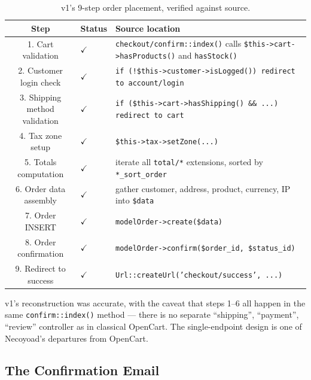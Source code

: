 \documentclass[11pt,a4paper]{article}
\begin{document}
\begin{table}[htbp]
\centering
\caption{v1's 9-step order placement, verified against source.}\label{tab:order-verify}
\small
\begin{tabularx}{\columnwidth}{clX}
\toprule
\textbf{Step} & \textbf{Status} & \textbf{Source location} \\
\midrule
1. Cart validation            & \colorbox{nodefillgreen}{$\checkmark$} & \texttt{checkout/confirm::index()} calls \texttt{\$this->cart->hasProducts()} and \texttt{hasStock()} \\
2. Customer login check       & \colorbox{nodefillgreen}{$\checkmark$} & \texttt{if (!\$this->customer->isLogged()) redirect to account/login} \\
3. Shipping method validation & \colorbox{nodefillgreen}{$\checkmark$} & \texttt{if (\$this->cart->hasShipping() \&\& ...) redirect to cart} \\
4. Tax zone setup             & \colorbox{nodefillgreen}{$\checkmark$} & \texttt{\$this->tax->setZone(...)} \\
5. Totals computation         & \colorbox{nodefillgreen}{$\checkmark$} & iterate all \texttt{total/*} extensions, sorted by \texttt{*\_sort\_order} \\
6. Order data assembly        & \colorbox{nodefillgreen}{$\checkmark$} & gather customer, address, product, currency, IP into \texttt{\$data} \\
7. Order INSERT               & \colorbox{nodefillgreen}{$\checkmark$} & \texttt{modelOrder->create(\$data)} \\
8. Order confirmation         & \colorbox{nodefillgreen}{$\checkmark$} & \texttt{modelOrder->confirm(\$order\_id, \$status\_id)} \\
9. Redirect to success        & \colorbox{nodefillgreen}{$\checkmark$} & \texttt{Url::createUrl('checkout/success', ...)} \\
\bottomrule
\end{tabularx}
\end{table}

v1's reconstruction was accurate, with the caveat that steps 1--6 all
happen in the same \texttt{confirm::index()} method --- there is no
separate ``shipping'', ``payment'', ``review'' controller as in
classical OpenCart. The single-endpoint design is one of Necoyoad's
departures from OpenCart.

\subsection{The Confirmation Email}
\end{document}
